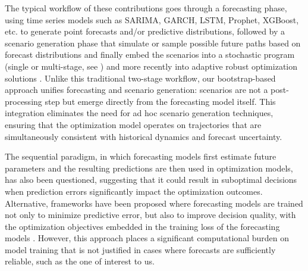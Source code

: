 \documentclass[ijoc,sglanonrev]{informs4}
\begin{document}
The typical workflow of these contributions goes through a forecasting phase, using time series models such as SARIMA, GARCH, LSTM, Prophet, XGBoost, etc. to generate point forecasts and/or predictive distributions, followed by a scenario generation phase that simulate or sample possible future paths based on forecast distributions and finally embed the scenarios into a stochastic program (single or multi-stage, see \citealt{R18,FTW18,BK19}) and more recently into adaptive robust optimization solutions \citep{BB23}. Unlike this traditional two-stage workflow, our bootstrap-based approach unifies forecasting and scenario generation: scenarios are not a post-processing step but emerge directly from the forecasting model itself. This integration eliminates the need for ad hoc scenario generation techniques, ensuring that the optimization model operates on trajectories that are simultaneously consistent with historical dynamics and forecast uncertainty. 

The sequential paradigm, in which forecasting models first estimate future parameters and the resulting predictions are then used in optimization models, has also been questioned, suggesting that it could result in suboptimal decisions when prediction errors significantly impact the optimization outcomes. Alternative, frameworks have been proposed where forecasting models are trained not only to minimize predictive error, but also to improve decision quality, with the optimization objectives embedded in the training loss of the forecasting models \citep{DAK17,WDT19}. However, this approach places a significant computational burden on model training that is not justified in cases where forecasts are sufficiently reliable, such as the one of interest to us.
\end{document}
